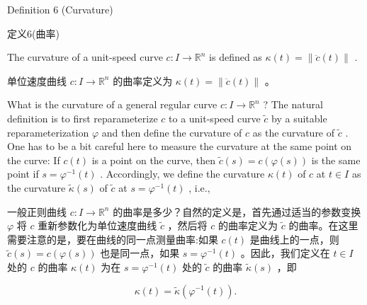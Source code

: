 \HRule

Definition 6 (Curvature)

\begin{tcolorbox}
定义6(曲率)
\end{tcolorbox}

\HRule

The curvature of a unit-speed curve \(c : I \rightarrow  {\mathbb{R}}^{n}\) is defined as \(\kappa \left( t\right)  = \parallel \ddot{c}\left( t\right) \parallel\) .

\begin{tcolorbox}
单位速度曲线 \(c : I \rightarrow  {\mathbb{R}}^{n}\) 的曲率定义为 \(\kappa \left( t\right)  = \parallel \ddot{c}\left( t\right) \parallel\) 。
\end{tcolorbox}

What is the curvature of a general regular curve \(c : I \rightarrow  {\mathbb{R}}^{n}\) ? The natural definition is to first reparameterize \(c\) to a unit-speed curve \(\widetilde{c}\) by a suitable reparameterization \(\varphi\) and then define the curvature of \(c\) as the curvature of \(\widetilde{c}\) . One has to be a bit careful here to measure the curvature at the same point on the curve: If \(c\left( t\right)\) is a point on the curve, then \(\widetilde{c}\left( s\right)  = c\left( {\varphi \left( s\right) }\right)\) is the same point if \(s = {\varphi }^{-1}\left( t\right)\) . Accordingly, we define the curvature \(\kappa \left( t\right)\) of \(c\) at \(t \in  I\) as the curvature \(\widetilde{\kappa }\left( s\right)\) of \(\widetilde{c}\) at \(s = {\varphi }^{-1}\left( t\right)\) , i.e.,

\begin{tcolorbox}
一般正则曲线 \(c : I \rightarrow  {\mathbb{R}}^{n}\) 的曲率是多少？自然的定义是，首先通过适当的参数变换 \(\varphi\) 将 \(c\) 重新参数化为单位速度曲线 \(\widetilde{c}\) ，然后将 \(c\) 的曲率定义为 \(\widetilde{c}\) 的曲率。在这里需要注意的是，要在曲线的同一点测量曲率:如果 \(c\left( t\right)\) 是曲线上的一点，则 \(\widetilde{c}\left( s\right)  = c\left( {\varphi \left( s\right) }\right)\) 也是同一点，如果 \(s = {\varphi }^{-1}\left( t\right)\) 。因此，我们定义在 \(t \in  I\) 处的 \(c\) 的曲率 \(\kappa \left( t\right)\) 为在 \(s = {\varphi }^{-1}\left( t\right)\) 处的 \(\widetilde{c}\) 的曲率 \(\widetilde{\kappa }\left( s\right)\) ，即
\end{tcolorbox}

\[
\kappa \left( t\right)  = \widetilde{\kappa }\left( {{\varphi }^{-1}\left( t\right) }\right) . \tag{1.3}
\]

